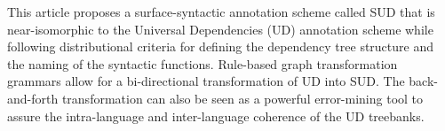 This article proposes a surface-syntactic annotation scheme called SUD that is near-isomorphic to the Universal Dependencies (UD) annotation scheme while following distributional criteria for defining the dependency tree structure and the naming of the syntactic functions. Rule-based graph transformation grammars allow for a bi-directional transformation of UD into SUD. The back-and-forth transformation can also be seen as a powerful error-mining tool to assure the intra-language and inter-language coherence of the UD treebanks.
